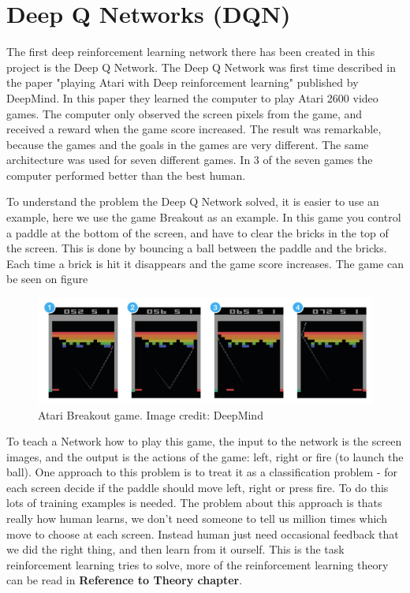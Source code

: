 \section{Deep Q Networks (DQN)}
\label{sec:DQN}
The first deep reinforcement learning network there has been created in this project is the Deep Q Network. The Deep Q Network was first time described in the paper "playing Atari with Deep reinforcement learning" \cite{DBLP:journals/corr/MnihKSGAWR13} published by DeepMind. In this paper they learned the computer to play Atari 2600 video games. The computer only observed the screen pixels from the game, and received a reward when the game score increased. The result was remarkable, because the games and the goals in the games are very different. The same architecture was used for seven different games. In 3 of the seven games the computer performed better than the best human. 

To understand the problem the Deep Q Network solved, it is easier to use an example, here we use the game Breakout as an example. In this game you control a paddle at the bottom of the screen, and have to clear the bricks in the top of the screen. This is done by bouncing a ball between the paddle and the bricks. Each time a brick is hit it disappears and the game score increases. The game can be seen on figure 

\begin{figure}[H]
	\centering
	\includegraphics[width=1\textwidth]{Figures/Architecture/DQN/Atari_breakout.png}
	\caption{Atari Breakout game. Image credit: DeepMind\cite{DBLP:journals/corr/MnihKSGAWR13} }
	\label{fig:Atari_breakout}
\end{figure}

To teach a Network how to play this game, the input to the network is the screen images, and the output is the actions of the game: left, right or fire (to launch the ball). One approach to this problem is to treat it as a classification problem - for each screen decide if the paddle should move left, right or press fire. To do this lots of training examples is needed. The problem about this approach is thats really how human learns, we don't need someone to tell us million times which move to choose at each screen. Instead human just need occasional feedback that we did the right thing, and then learn from it ourself. This is the task reinforcement learning tries to solve, more of the reinforcement learning theory can be read in \textbf{Reference to Theory chapter}.

